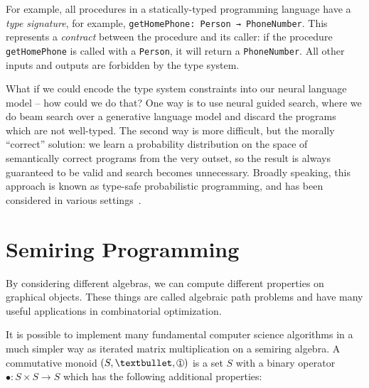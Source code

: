\documentclass[10pt]{article}
\newcommand*\circled[1]{\tikz[baseline=-0.1cm]{\node[shape=circle,draw,inner sep=0.48pt] (char) {\fontsize{7}{12}\textsf{#1}};}}
\begin{document}
For example, all procedures in a statically-typed programming language have a \textit{type signature}, for example, \texttt{getHomePhone: Person → PhoneNumber}. This represents a \textit{contract} between the procedure and its caller: if the procedure \texttt{getHomePhone} is called with a \texttt{Person}, it will return a \texttt{PhoneNumber}. All other inputs and outputs are forbidden by the type system.

What if we could encode the type system constraints into our neural language model -- how could we do that? One way is to use neural guided search, where we do beam search over a generative language model and discard the programs which are not well-typed. The second way is more difficult, but the morally ``correct'' solution: we learn a probability distribution on the space of semantically correct programs from the very outset, so the result is always guaranteed to be valid and search becomes unnecessary. Broadly speaking, this approach is known as type-safe probabilistic programming, and has been considered in various settings~\cite{murali2017bayesian}.

\pagebreak\section{Semiring Programming}\label{sec:semiring-programming}

By considering different algebras, we can compute different properties on graphical objects. These things are called algebraic path problems and have many useful applications in combinatorial optimization.

It is possible to implement many fundamental computer science algorithms in a much simpler way as iterated matrix multiplication on a semiring algebra. A commutative monoid $(S, •, \circled{1})$ is a set $S$ with a binary operator $•: S \times S → S$ which has the following additional properties:

\end{document}
